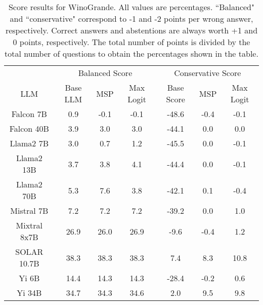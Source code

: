 \renewcommand\arraystretch{1.2}
\begin{table*}
\centering
\begin{tabular}{c|c|c|c|c|c|c}
& \multicolumn{3}{c|}{Balanced Score} & \multicolumn{3}{c}{Conservative Score} \\ 
LLM & Base LLM & MSP & Max Logit & Base Score & MSP & Max Logit\\ \hline
Falcon 7B & 0.9 & -0.1 & -0.1 & -48.6 & -0.4 & -0.1\\
Falcon 40B & 3.9 & 3.0 & 3.0 & -44.1 & 0.0 & 0.0\\
Llama2 7B & 3.0 & 0.7 & 1.2 & -45.5 & 0.0 & -0.1\\
Llama2 13B & 3.7 & 3.8 & 4.1 & -44.4 & 0.0 & -0.1\\
Llama2 70B & 5.3 & 7.6 & 3.8 & -42.1 & 0.1 & -0.4\\
Mistral 7B & 7.2 & 7.2 & 7.2 & -39.2 & 0.0 & 1.0\\
Mixtral 8x7B & 26.9 & 26.0 & 26.9 & -9.6 & -0.4 & 1.2\\
SOLAR 10.7B & 38.3 & 38.3 & 38.3 & 7.4 & 8.3 & 10.8\\
Yi 6B & 14.4 & 14.3 & 14.3 & -28.4 & -0.2 & 0.6\\
Yi 34B & 34.7 & 34.3 & 34.6 & 2.0 & 9.5 & 9.8\\
\hline
\end{tabular}
\caption{Score results for WinoGrande. All values are percentages. ``Balanced" and ``conservative" correspond to -1 and -2 points per wrong answer, respectively. Correct answers and abstentions are always worth +1 and 0 points, respectively. The total number of points is divided by the total number of questions to obtain the percentages shown in the table.}
\label{tab:winogrande_score}
\end{table*}
